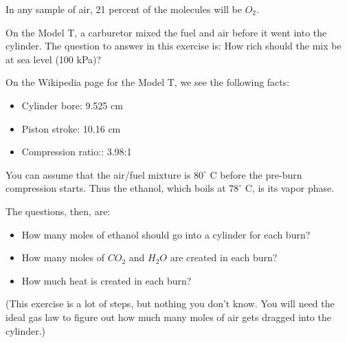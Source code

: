 In any sample of air,  21 percent of the molecules will be $O_2$.

\begin{Exercise}[title={Fuel Mix for the Model T},  label=fuelmix]

On the Model T, a carburetor mixed the fuel and air before it went into the cylinder.   The question to answer in this exercise is: How rich should the mix be at sea level (100 kPa)?

On the Wikipedia page for the Model T,  we see the following facts:
\begin{itemize}
\item Cylinder bore: 9.525 cm
\item Piston stroke: 10.16 cm
\item Compression ratio:: 3.98:1
\end{itemize}

You can assume that the air/fuel mixture is $80^\circ$ C before the pre-burn compression starts.  Thus the ethanol,  which boils at $78^\circ$ C, is its vapor phase.

The questions, then, are:

\begin{itemize}
\item How many moles of ethanol should go into a cylinder for each burn?
\item How many moles of $CO_2$  and  $H_2O$ are created in each burn?
\item How much heat is created in each burn?
\end{itemize}

(This exercise is a lot of steps, but nothing you don't know.  You will need the ideal gas law to figure out how much many moles of air gets dragged into the cylinder.)

\end{Exercise}

